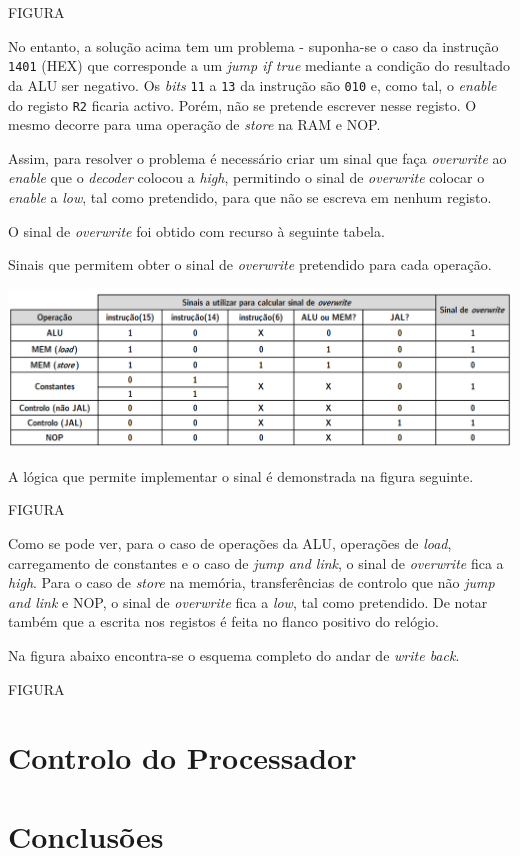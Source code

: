 \documentclass[11pt]{article}
\numberwithin{equation}{section}
\begin{document}
FIGURA

No entanto, a solução acima tem um problema - suponha-se o caso da instrução \texttt{1401} (HEX) que corresponde a um \textit{jump if true} mediante a condição do resultado da ALU ser negativo. Os \textit{bits} \texttt{11} a \texttt{13} da instrução são \texttt{010} e, como tal, o \textit{enable} do registo \texttt{R2} ficaria activo. Porém, não se pretende escrever nesse registo. O mesmo decorre para uma operação de \textit{store} na RAM e NOP. 

Assim, para resolver o problema é necessário criar um sinal que faça \textit{overwrite} ao \textit{enable} que o \textit{decoder} colocou a \textit{high}, permitindo o sinal de \textit{overwrite} colocar o \textit{enable} a \textit{low}, tal como pretendido, para que não se escreva em nenhum registo.

O sinal de \textit{overwrite} foi obtido com recurso à seguinte tabela.

\vspace{1.5mm}
\begin{table}[h]
	\centering
	\caption{Sinais que permitem obter o sinal de \textit{overwrite} pretendido para cada operação.}
	\vspace{-2mm}
 	\includegraphics[width=1\linewidth]{tabelas/tabelaWE}
\end{table}

A lógica que permite implementar o sinal é demonstrada na figura seguinte.

FIGURA

Como se pode ver, para o caso de operações da ALU, operações de \textit{load}, carregamento de constantes e o caso de \textit{jump and link}, o sinal de \textit{overwrite} fica a \textit{high}. Para o caso de \textit{store} na memória, transferências de controlo que não \textit{jump and link} e NOP, o sinal de \textit{overwrite} fica a \textit{low}, tal como pretendido. De notar também que a escrita nos registos é feita no flanco positivo do relógio. 

Na figura abaixo encontra-se o esquema completo do andar de \textit{write back}.

FIGURA

\section{Controlo do Processador}


\section{Conclusões}

\pagebreak

\listoftodos
\end{document}
